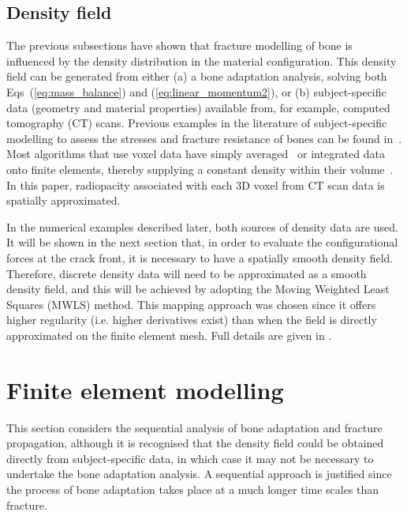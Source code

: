 \documentclass[review]{elsarticle}
\numberwithin{equation}{section}
\begin{document}
\subsection{Density field}
\label{sec:dens_mapping}
The previous subsections have shown that  fracture modelling of bone is influenced by the density distribution in the material configuration. This density field can be generated from either (a) a bone adaptation analysis, solving both Eqs~(\ref{eq:mass_balance}) and (\ref{eq:linear_momentum2}), or (b) subject-specific data (geometry and material properties) available from, for example, computed tomography (CT) scans. Previous examples in the literature of subject-specific modelling to assess the stresses and fracture resistance of bones can be found in~\citep{poelert2013patient,Helgason2008b,Yosibash2010}. Most algorithms that use voxel data have simply averaged~\citep{zannoni1999material} or integrated data onto finite elements, thereby supplying a constant density within their volume~\citep{taddei2007material, schileo2008subject}. In this paper, radiopacity associated with each 3D voxel from CT scan data is spatially approximated. 

In the numerical examples described later, both sources of density data are used. It will be shown in the next section that, in order to evaluate the configurational forces at the crack front, it is necessary to have a spatially smooth density field. Therefore, discrete density data will need to be approximated as a smooth density field, and this will be achieved by adopting the Moving Weighted Least Squares (MWLS) method. This mapping approach was chosen since it offers higher regularity (i.e. higher derivatives exist) than when the field is
directly approximated on the finite element mesh. Full details are given in \citep{karol_lewandowski_moving_2019}.  %


\section{Finite element modelling} \label{sec:fem_modelling}

This section considers the sequential analysis of bone adaptation and fracture propagation, although it is recognised that the density field could be obtained directly from subject-specific data, in which case it may not be necessary to undertake the bone adaptation analysis. A sequential approach is justified since the process of bone adaptation takes place at a much longer time scales than fracture.
\end{document}
